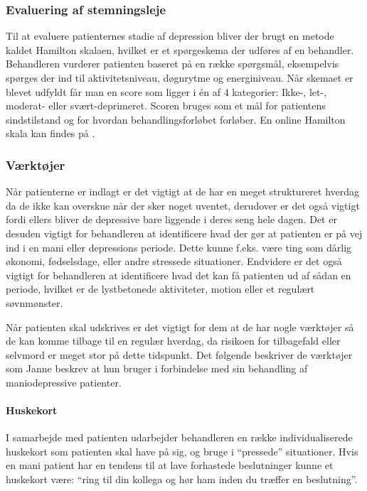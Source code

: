 \subsubsection{Evaluering af stemningsleje}
Til at evaluere patienternes stadie af depression bliver der brugt en metode kaldet Hamilton skalaen, hvilket er et spørgeskema der udføres af en behandler. 
Behandleren vurderer patienten baseret på en række spørgsmål, eksempelvis spørges der ind til aktivitetsniveau, døgnrytme og energiniveau.
Når skemaet er blevet udfyldt får man en score som ligger i én af 4 kategorier: Ikke-, let-, moderat- eller svært-deprimeret. 
Scoren bruges som et mål for patientens sindstilstand og for hvordan behandlingsforløbet forløber.
En online Hamilton skala kan findes på \citet{hamilton}.

\subsubsection{Værktøjer}
Når patienterne er indlagt er det vigtigt at de har en meget struktureret hverdag da de ikke kan overskue når der sker noget uventet, derudover er det også vigtigt fordi ellers bliver de depressive bare liggende i deres seng hele dagen.
Det er desuden vigtigt for behandleren at identificere hvad der gør at patienten er på vej ind i en mani eller depressions periode.
Dette kunne f.eks. være ting som dårlig økonomi, fødselsdage, eller andre stressede situationer.
Endvidere er det også vigtigt for behandleren at identificere hvad det kan få patienten ud af sådan en periode, hvilket er de lystbetonede aktiviteter, motion eller et regulært søvnmønster.

Når patienten skal udskrives er det vigtigt for dem at de har nogle værktøjer så de kan komme tilbage til en regulær hverdag, da risikoen for tilbagefald eller selvmord er meget stor på dette tidspunkt. 
Det følgende beskriver de værktøjer som Janne beskrev at hun bruger i forbindelse med sin behandling af maniodepressive patienter.

\paragraph{Huskekort}
I samarbejde med patienten udarbejder behandleren en række individualiserede huskekort som patienten skal have på sig, og bruge i ``pressede'' situationer. 
Hvis en mani patient har en tendens til at lave forhastede beslutninger kunne et huskekort være: ``ring til din kollega og hør ham inden du træffer en beslutning''.

